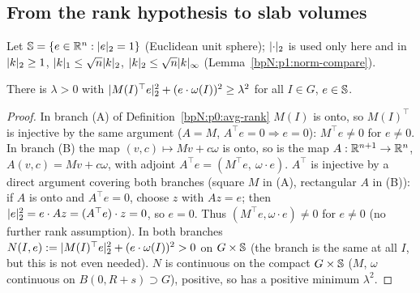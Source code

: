 \subsection{From the rank hypothesis to slab volumes}\label{bpN:p12:s-rank}

Let $\mathbb S=\{e\in\mathbb{R}^n:\lvert e\rvert_2=1\}$ (Euclidean unit sphere); $\lvert \cdot\rvert_2$ is used only here and in $\lvert k\rvert_2\ge1$, $\lvert k\rvert_1\le\sqrt n\lvert k\rvert_2$, $\lvert k\rvert_2\le\sqrt n\lvert k\rvert_\infty$ (Lemma~\ref{bpN:p1:norm-compare}).

\begin{lemma}\label{bpN:p12:lambda}
There is $\lambda>0$ with $\lvert M(I)^\top e\rvert_2^2+(e\cdot\omega(I))^2\ge\lambda^2$ for all $I\in G$, $e\in\mathbb S$.
\end{lemma}
\begin{proof}
\label{stepN:p12:la-inj} In branch (A) of Definition~\ref{bpN:p0:avg-rank} $M(I)$ is onto, so $M(I)^\top$ is injective by the same argument ($A=M$, $A^\top e=0\Rightarrow e=0$): $M^\top e\ne0$ for $e\ne0$. In branch (B) the map $(v,c)\mapsto Mv+c\omega$ is onto, so is the map $A:\mathbb{R}^{n+1}\to\mathbb{R}^n$, $A(v,c)=Mv+c\omega$, with adjoint $A^\top e=(M^\top e,\ \omega\cdot e)$. $A^\top$ is injective by a direct argument covering both branches (square $M$ in (A), rectangular $A$ in (B)): if $A$ is onto and $A^\top e=0$, choose $z$ with $Az=e$; then $\lvert e\rvert_2^2=e\cdot Az=(A^\top e)\cdot z=0$, so $e=0$. Thus $(M^\top e,\omega\cdot e)\ne0$ for $e\ne0$ (no further rank assumption). In both branches $N(I,e):=\lvert M(I)^\top e\rvert_2^2+(e\cdot\omega(I))^2>0$ on $G\times\mathbb S$ (the branch is the same at all $I$, but this is not even needed).
\label{stepN:p12:la-cpt} $N$ is continuous on the compact $G\times\mathbb S$ ($M$, $\omega$ continuous on $B(0,R+s)\supset G$), positive, so has a positive minimum $\lambda^2$.
\end{proof}

